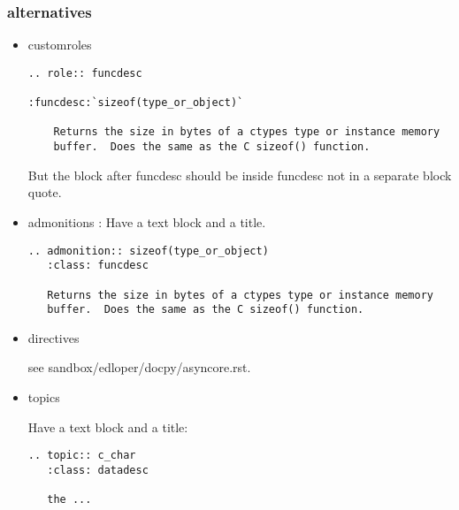 \subsubsection{alternatives\label{-alternatives}}
\begin{itemize}
\item {} 
customroles
\begin{verbatim}
.. role:: funcdesc

:funcdesc:`sizeof(type_or_object)`

    Returns the size in bytes of a ctypes type or instance memory
    buffer.  Does the same as the C sizeof() function.
\end{verbatim}

But the block after funcdesc should be inside funcdesc not in a separate
block quote.

\item {} 
admonitions :
Have a text block and a title.
\begin{verbatim}
.. admonition:: sizeof(type_or_object)
   :class: funcdesc

   Returns the size in bytes of a ctypes type or instance memory
   buffer.  Does the same as the C sizeof() function.
\end{verbatim}

\item {} 
directives

see sandbox/edloper/docpy/asyncore.rst.

\item {} 
topics

Have a text block and a title:
\begin{verbatim}
.. topic:: c_char
   :class: datadesc

   the ...
\end{verbatim}

\end{itemize}

